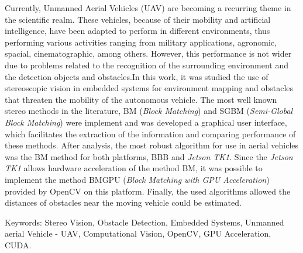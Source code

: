 \vspace{0.05\textheight}

Currently, Unmanned Aerial Vehicles (UAV) are becoming a recurring theme in the scientific realm. These vehicles, because of their mobility and artificial intelligence, have been adapted to perform in different environments, thus performing various activities ranging from
military applications, agronomic, spacial, cinematographic, among others. However, this performance is not wider due to  problems related to the recognition of the surrounding environment and the detection objects and obstacles.In this work, it was studied the use of stereoscopic vision in embedded systems for environment mapping and obstacles that threaten the mobility of the autonomous vehicle. The most well known stereo methods in the literature, BM (\textit{Block Matching}) and SGBM (\textit{Semi-Global Block Matching}) were implement and was developed a graphical user interface, which facilitates the extraction of the information and comparing performance of these methods. After analysis, the most robust algorithm for use in aerial vehicles was the BM method for both platforms, BBB and \textit{Jetson TK1}. Since the \textit{Jetson TK1} allows hardware acceleration of the method BM, it was possible to implement the method BMGPU (\textit{Block Matching with GPU Acceleration}) provided by OpenCV on this platform. Finally, the used algorithms allowed the distances of obstacles near the moving vehicle could be estimated.

\vspace{0.05\textheight}

Keywords: Stereo Vision, Obstacle Detection, Embedded Systems, Unmanned aerial Vehicle - UAV, Computational Vision, OpenCV, GPU Acceleration, CUDA.


\cleardoublepage

\listoffigures %

\listoftables %

\cleardoublepage

\vspace{0.11\textheight} 


